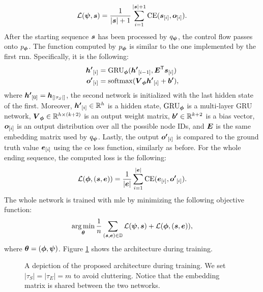 $$\Loss(\EncParam, \Vector{s}) = \frac{1}{|\Vector{s}|+1} \sum_{i=1}^{|\Vector{s}|+1} \mathrm{CE}(\Elem{s}{i}, \Elem{o}{i}).$$
After the starting sequence $\Vector{s}$ has been processed by $q_{\boldsymbol{\psi}}$, the control flow passes onto $p_{\boldsymbol{\phi}}$. The function computed by $p_{\boldsymbol{\phi}}$ is similar to the one implemented by the first \gls{rnn}. Specifically, it is the following:
\begin{align*}
    \Elem{h'}{i} &= \Op{GRU}_{\DecParam}(\Elem{h'}{i-1}, \Matrix{E}^{\Transpose}\Elem{s}{i})\\
    \Elem{o'}{i} &= \softmax(\Matrix{V}_{\DecParam}\Elem{h'}{i} + \Vector{b'}),
\end{align*}
where $\Elem{h'}{0} = \Elem{h}{|\tau_S|}$, \ie the second network is initialized with the last hidden state of the first. Moreover, $\Elem{h'}{i} \in \Real^h$ is a hidden state, $\operatorname{GRU}_{\boldsymbol{\phi}}$ is a multi-layer GRU network, $\Matrix{V}_{\DecParam} \in \Real^{h \times (k+2)}$ is an output weight matrix,  $\Vector{b'} \in \Real^{k+2}$ is a bias vector, $\Elem{o}{i}$ is an output distribution over all the possible node IDs, and $\Matrix{E}$ is the same embedding matrix used by $q_{\boldsymbol{\psi}}$.  Lastly, the output $\Elem{o'}{i}$ is compared to the ground truth value $\Elem{e}{i}$ using the \gls{ce} loss function, similarly as before. For the whole ending sequence, the computed loss is the following:
$$\Loss(\DecParam, (\Vector{s}, \Vector{e})) = \frac{1}{|\Vector{e}|} \sum_{i=1}^{|\Vector{e}|} \mathrm{CE}(\Elem{e}{i}, \Elem{o'}{i}).$$
The whole network is trained with \gls{mle} by minimizing the following objective function:
$$\argmin_{\Param} \frac{1}{n} \sum_{(\Vector{s},\Vector{e}) \in \Data} \Loss(\EncParam, \Vector{s}) + \Loss(\DecParam, (\Vector{s}, \Vector{e})),$$
where $\boldsymbol{\theta} = (\boldsymbol{\phi}, \boldsymbol{\psi})$. Figure \ref{fig:model-training} shows the architecture during training.

\begin{figure}[h!]
    \centering
    \resizebox{.8\textwidth}{!}{}
    \caption{A depiction of the proposed architecture during training. We set $|\tau_S| = |\tau_E| = m$ to avoid cluttering. Notice that the embedding matrix is shared between the two networks.}
    \label{fig:model-training}
\end{figure}

